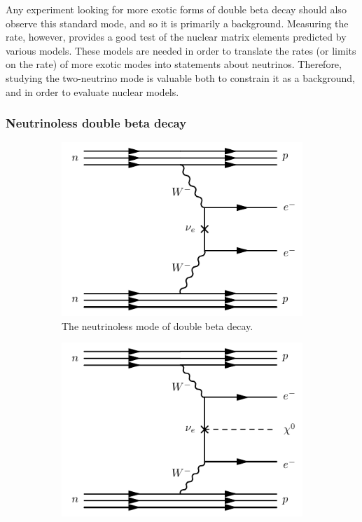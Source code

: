 \documentclass[herrin-thesis.tex]{subfiles}
\begin{document}
Any experiment looking for more exotic forms of double beta decay should also observe this standard mode, and so it is primarily a background. Measuring the rate, however, provides a good test of the nuclear matrix elements predicted by various models. These models are needed in order to translate the rates (or limits on the rate) of more exotic modes into statements about neutrinos. Therefore, studying the two-neutrino mode is valuable both to constrain it as a background, and in order to evaluate nuclear models.

\subsubsection{Neutrinoless double beta decay}

\begin{figure}[htp]
         \begin{subfigure}[b]{0.48\textwidth}
		\centering
		\includegraphics[width=\textwidth]{./feynman_diagrams/zeronubetabeta.pdf}
		\caption[Diagram of \(0\nu\beta\beta\)]{The neutrinoless mode of double beta decay.}
		\label{fig:nu_diagram_0nubb}
	\end{subfigure}\hfill%
         \begin{subfigure}[b]{0.48\textwidth}
		\centering
		\includegraphics[width=\textwidth]{./feynman_diagrams/zeronubetabetamajoron.pdf}

\end{subfigure}
\end{figure}
\end{document}
